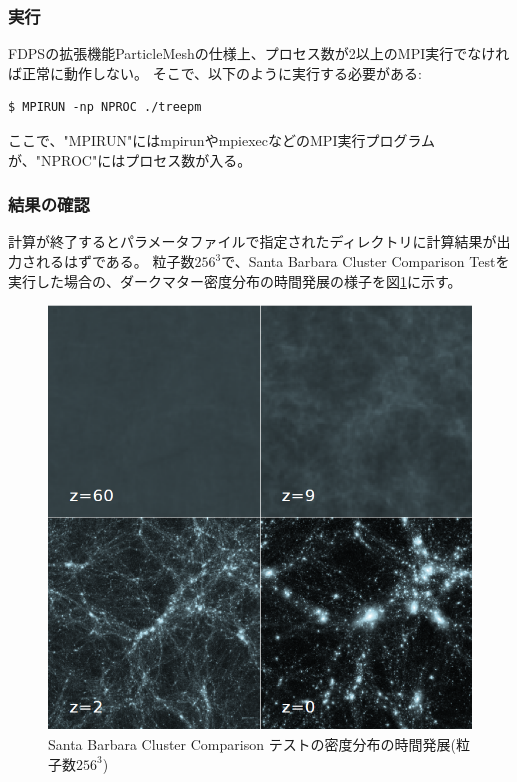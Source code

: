\subsubsection{実行}
FDPSの拡張機能ParticleMeshの仕様上、プロセス数が2以上のMPI実行でなければ正常に動作しない。
そこで、以下のように実行する必要がある:
\begin{screen}
\begin{verbatim}
$ MPIRUN -np NPROC ./treepm
\end{verbatim}
\end{screen}
ここで、"MPIRUN"にはmpirunやmpiexecなどのMPI実行プログラムが、"NPROC"にはプロセス数が入る。

\subsubsection{結果の確認}
計算が終了するとパラメータファイルで指定されたディレクトリに計算結果が出力されるはずである。
粒子数$256^{3}$で、Santa Barbara Cluster Comparison Testを実行した場合の、ダークマター密度分布の時間発展の様子を図\ref{fig:treepm}に示す。

\begin{figure}[h]
\centering
\includegraphics[width=0.666\linewidth]{./fig/sb256.png}
\caption{Santa Barbara Cluster Comparison テストの密度分布の時間発展(粒子数$256^{3}$)}
\label{fig:treepm}
\end{figure}

\endifCpp %